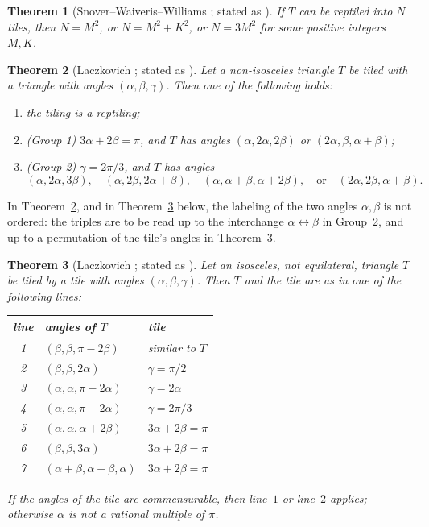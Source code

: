 \documentclass[11pt]{amsart}
\newtheorem{theorem}{Theorem}
\theoremstyle{remark}
\begin{document}
\begin{theorem}[{Snover--Waiveris--Williams \cite{SWW91}; stated as \cite[Theorem~6]{BLZ633}}]\label{thm:reptile}
If $T$ can be reptiled into $N$ tiles, then $N=M^2$, or $N=M^2+K^2$, or $N=3M^2$ for some positive integers $M,K$.
\end{theorem}

\begin{theorem}[{Laczkovich \cite[Theorem~4.1]{Lacz95}; stated as \cite[Theorem~11]{BLZ633}}]\label{thm:classification}
Let a non-isosceles triangle $T$ be tiled with a triangle with angles $(\alpha,\beta,\gamma)$. Then one of the following holds:
\begin{enumerate}
\item the tiling is a reptiling;
\item \textup{(Group 1)} $3\alpha+2\beta=\pi$, and $T$ has angles $(\alpha,2\alpha,2\beta)$ or $(2\alpha,\beta,\alpha+\beta)$;
\item \textup{(Group 2)} $\gamma=2\pi/3$, and $T$ has angles
\[
(\alpha,2\alpha,3\beta),\quad
(\alpha,2\beta,2\alpha+\beta),\quad
(\alpha,\alpha+\beta,\alpha+2\beta),\quad\text{or}\quad
(2\alpha,2\beta,\alpha+\beta).
\]
\end{enumerate}
\end{theorem}

In Theorem~\ref{thm:classification}, and in Theorem~\ref{thm:isoclass} below, the labeling of the two angles $\alpha,\beta$ is not ordered: the triples are to be read up to the interchange $\alpha\leftrightarrow\beta$ in Group~2, and up to a permutation of the tile's angles in Theorem~\ref{thm:isoclass}.

\begin{theorem}[{Laczkovich \cite{Lacz95}; stated as \cite[Theorem~3.1 and Table~1]{BeesonIso}}]\label{thm:isoclass}
Let an isosceles, not equilateral, triangle $T$ be tiled by a tile with angles $(\alpha,\beta,\gamma)$. Then $T$ and the tile are as in one of the following lines:
\begin{center}
\begin{tabular}{@{}cll@{}}
\toprule
line & angles of $T$ & tile \\
\midrule
1 & $(\beta,\beta,\pi-2\beta)$ & similar to $T$ \\
2 & $(\beta,\beta,2\alpha)$ & $\gamma=\pi/2$ \\
3 & $(\alpha,\alpha,\pi-2\alpha)$ & $\gamma=2\alpha$ \\
4 & $(\alpha,\alpha,\pi-2\alpha)$ & $\gamma=2\pi/3$ \\
5 & $(\alpha,\alpha,\alpha+2\beta)$ & $3\alpha+2\beta=\pi$ \\
6 & $(\beta,\beta,3\alpha)$ & $3\alpha+2\beta=\pi$ \\
7 & $(\alpha+\beta,\alpha+\beta,\alpha)$ & $3\alpha+2\beta=\pi$ \\
\bottomrule
\end{tabular}
\end{center}
If the angles of the tile are commensurable, then line~$1$ or line~$2$ applies; otherwise $\alpha$ is not a rational multiple of $\pi$.
\end{theorem}
\end{document}
